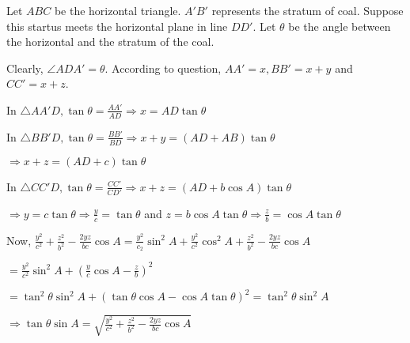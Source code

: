  Let $ABC$ be the horizontal triangle. $A'B'$ represents the stratum of coal. Suppose this
  startus meets the horizontal plane in line $DD'$. Let $\theta$ be the angle between the
  horizontal and the stratum of the coal.

  Clearly, $\angle ADA' = \theta$. According to question, $AA' = x, BB' = x + y$ and
  $CC' = x + z$.

  In $\triangle AA'D, \tan\theta = \frac{AA'}{AD} \Rightarrow x = AD\tan\theta$

  In $\triangle BB'D, \tan\theta = \frac{BB'}{BD} \Rightarrow x + y = (AD + AB)\tan\theta$

  $\Rightarrow x + z = (AD + c)\tan\theta$

  In $\triangle CC'D, \tan\theta = \frac{CC'}{CD'} \Rightarrow x + z = (AD + b\cos A)\tan\theta$

  $\Rightarrow y = c\tan\theta \Rightarrow \frac{y}{c} = \tan\theta$ and $z = b\cos
  A\tan\theta \Rightarrow \frac{z}{b} = \cos A\tan\theta$

  Now, $\frac{y^2}{c^2} + \frac{z^2}{b^2} - \frac{2yz}{bc}\cos A = \frac{y^2}{c_2}\sin^2A +
  \frac{y^2}{c^2}\cos^2A + \frac{z^2}{b^2} - \frac{2yz}{bc}\cos A$

  $= \frac{y^2}{c^2}\sin^2A + \left(\frac{y}{c}\cos A - \frac{z}{b}\right)^2$

  $= \tan^2\theta\sin^2A + (\tan\theta\cos A - \cos A\tan\theta)^2 = \tan^2\theta\sin^2A$

  $\Rightarrow \tan\theta\sin A = \sqrt{\frac{y^2}{c^2} + \frac{z^2}{b^2} - \frac{2yz}{bc}\cos A}$

\stopitemize
